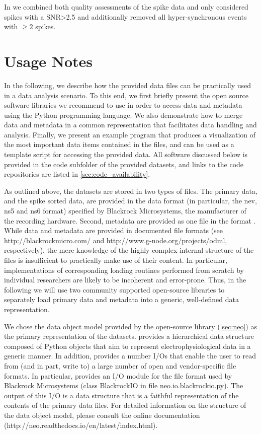 {In \cite{Torre_2016} we combined both quality assessments of the spike data and only considered spikes with a SNR>2.5 and additionally removed all hyper-synchronous events with $\ge2$ spikes. 

\section{Usage Notes}
\label{sec:usage}

In the following, we describe how the provided data files can be practically used in a data analysis scenario. To this end, we first briefly present the open source software libraries we recommend to use in order to access data and metadata using the Python programming language. We also demonstrate how to merge data and metadata in a common representation that facilitates data handling and analysis. Finally, we present an example program that produces a visualization of the most important data items contained in the files, and can be used as a template script for accessing the provided data. All software discussed below is provided in the code subfolder of the provided datasets, and links to the code repositories are listed in \cref{sec:code_availability}.

As outlined above, the datasets are stored in two types of files. The primary data, and the spike sorted data, are provided in the data format (in particular, the nev, ns5 and ns6 format) specified by Blackrock Microsystems, the manufacturer of the recording hardware. Second, metadata are provided as one file in the  format \cite{Grewe_2011}. While data and metadata are provided in documented file formats (see http://blackrockmicro.com/ and http://www.g-node.org/projects/odml, respectively), the mere knowledge of the highly complex internal structure of the files is insufficient to practically make use of their content. In particular, implementations of corresponding loading routines performed from scratch by individual researchers are likely to be incoherent and error-prone. Thus, in the following we will use two community supported open-source libraries to separately load primary data and metadata into a generic, well-defined data representation. 

We chose the data object model provided by the open-source  library (\cref{sec:neo}) \cite{Garcia_2014} as the primary representation of the datasets.  provides a hierarchical data structure composed of Python objects that aim to represent electrophysiological data in a generic manner. In addition,  provides a number I/Os that enable the user to read from (and in part, write to) a large number of open and vendor-specific file formats. In particular,  provides an I/O module for the file format used by Blackrock Microsystems (class BlackrockIO in file neo.io.blackrockio.py). The output of this I/O is a  data structure that is a faithful representation of the contents of the primary data files. For detailed information on the structure of the  data object model, please consult the online documentation (http://neo.readthedocs.io/en/latest/index.html).

}
